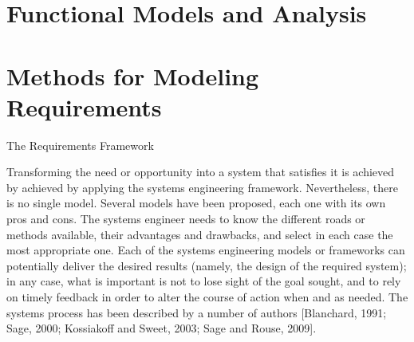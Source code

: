 
\section{Functional Models and Analysis}


\section{Methods for Modeling Requirements}


The Requirements Framework

Transforming the need or opportunity into a system that satisfies it is achieved by achieved by applying the systems engineering framework. Nevertheless, there is no single model. Several models have been proposed, each one with its own pros and cons. The systems engineer needs to know the different roads or methods available, their advantages and drawbacks, and select in each case the most appropriate one. Each of the systems engineering models or frameworks can potentially deliver the desired results (namely, the design of the required system); in any case, what is important is not to lose sight of the goal sought, and to rely on timely feedback in order to alter the course of action when and as needed. The systems process has been described by a number of authors [Blanchard, 1991; Sage, 2000; Kossiakoff and Sweet, 2003; Sage and Rouse, 2009].

